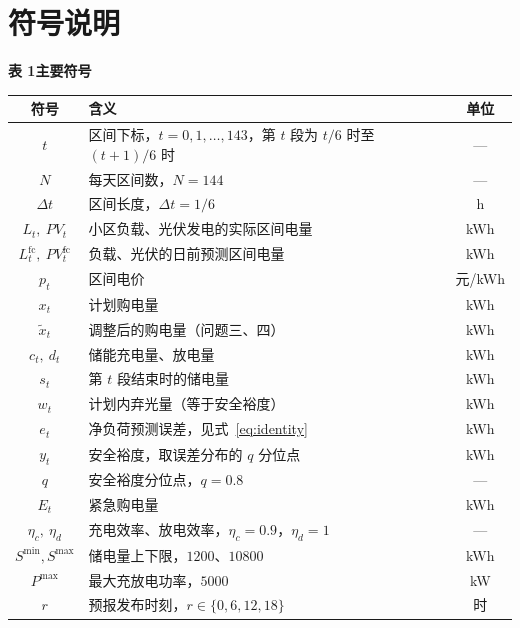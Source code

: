 \section{符号说明}

\begin{center}
{\fontsize{10.5pt}{12.6pt}\heiti\bfseries 表 1\quad 主要符号}\par
\vspace{0.5em}
\begin{tabular}{clc}
\toprule
符号 & 含义 & 单位 \\
\midrule
$t$ & 区间下标，$t=0,1,\dots,143$，第 $t$ 段为 $t/6$ 时至 $(t+1)/6$ 时 & --- \\
$N$ & 每天区间数，$N=144$ & --- \\
$\Delta t$ & 区间长度，$\Delta t=1/6$ & h \\
$L_t,\ PV_t$ & 小区负载、光伏发电的实际区间电量 & kWh \\
$L_t^{\mathrm{fc}},\ PV_t^{\mathrm{fc}}$ & 负载、光伏的日前预测区间电量 & kWh \\
$p_t$ & 区间电价 & 元/kWh \\
$x_t$ & 计划购电量 & kWh \\
$\tilde x_t$ & 调整后的购电量（问题三、四） & kWh \\
$c_t,\ d_t$ & 储能充电量、放电量 & kWh \\
$s_t$ & 第 $t$ 段结束时的储电量 & kWh \\
$w_t$ & 计划内弃光量（等于安全裕度） & kWh \\
$e_t$ & 净负荷预测误差，见式~\eqref{eq:identity} & kWh \\
$y_t$ & 安全裕度，取误差分布的 $q$ 分位点 & kWh \\
$q$ & 安全裕度分位点，$q=0.8$ & --- \\
$E_t$ & 紧急购电量 & kWh \\
$\eta_c,\ \eta_d$ & 充电效率、放电效率，$\eta_c=0.9$，$\eta_d=1$ & --- \\
$S^{\min},S^{\max}$ & 储电量上下限，$1200$、$10800$ & kWh \\
$P^{\max}$ & 最大充放电功率，$5000$ & kW \\
$r$ & 预报发布时刻，$r\in\{0,6,12,18\}$ & 时 \\
\bottomrule
\end{tabular}
\end{center}

